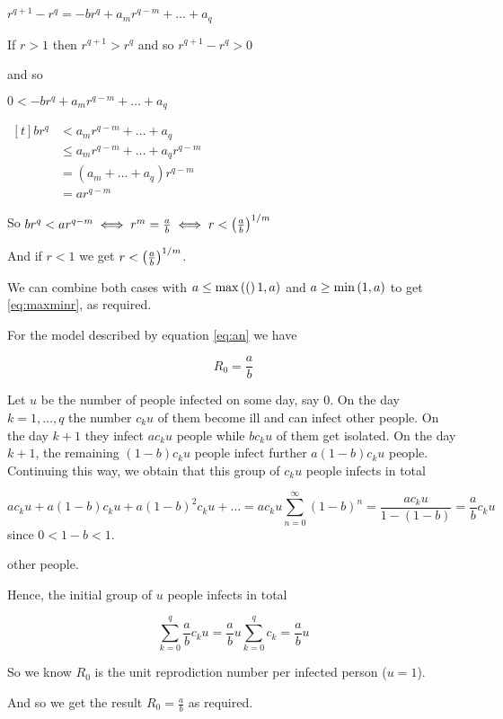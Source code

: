 \begin{theorem}
\begin{pf}
\begin{enumerate}[(a)]
    \imp $r^{q+1} - r^q =-br^q + a_mr^{q-m} + \dots  + a_q$
    
    If $r>1$ then $r^{q+1}>r^q$ and so $r^{q+1}-r^q>0$
    
    and so 
    
    $0<-br^q + a_mr^{q-m} +  \dots + a_q$
    
    \imp $\begin{aligned}[t]
    br^q 
    &<    a_mr^{q-m} +  \dots + a_q\\
    &\leq a_mr^{q-m} +  \dots + a_qr^{q-m} \\
    &= (a_m + \dots + a_q)r^{q-m} \\
    &= ar^{q-m} 
    \end{aligned}$
    
    So $br^q < ar^{q-m} \iff r^m=\frac{a}{b} \iff r<\left(\frac{a}{b}\right)^{1/m}$
    
    And if $r<1$ we get $r<\left(\frac{a}{b}\right)^{1/m}$.
    
    We can combine both cases with $a\leq \max\left((\right)1,a)$ and $a\geq \min\left(1,a\right)$ to get \ref{eq:maxminr}, as required.
\end{enumerate}
\end{pf}
\end{theorem}

\begin{lemma}
For the model described by equation \ref{eq:an} we have

$$R_0=\frac{a}{b}$$

\begin{pf}
Let $u$ be the number of people infected on some day, say $0$. On the day $k = 1, \dots , q$ the number $c_ku$ of them become ill and can infect other people. On the day $k + 1$ they infect $ac_ku$ people while $bc_ku$ of them get isolated. On the day $k + 1$, the remaining $(1 - b) c_ku$ people infect further $a (1 - b) c_ku$ people. Continuing this way, we obtain that this group of $c_ku$ people infects in total

$$ac_ku+a(1-b)c_ku+a(1-b)^2c_ku+\dots=ac_ku\sum\limits_{n=0}^\infty (1-b)^n = \frac{ac_ku}{1-(1-b)}=\frac{a}{b}c_ku$$ since $0<1-b<1$.

other people.

Hence, the initial group of $u$ people infects in total 

$$\sum\limits_{k=0}^q \frac{a}{b}c_ku 
= \frac{a}{b}u\sum\limits_{k=0}^q c_k
= \frac{a}{b}u$$

So we know $R_0$ is the unit reprodiction number per infected person ($u=1$).

And so we get the result $R_0=\frac{a}{b}$ as required.
\end{pf}
\end{lemma}


